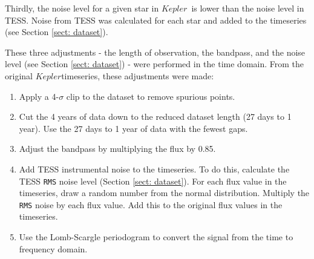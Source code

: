 \documentclass[a4paper,fleqn,usenatbib,useAMS]{mnras}
\newcommand{\kep}{\ensuremath{Kepler}\:}
\begin{document}

Thirdly, the noise level for a given star in \kep \ is lower than the noise level in TESS. %
Noise from TESS was calculated for each star and added to the timeseries (see Section \ref{sect: dataset}).

These three adjustments - the length of observation, the bandpass, and the noise level (see Section \ref{sect: dataset}) - were performed in the time domain. From the original \kep timeseries, these adjustments were made:
\begin{enumerate}
\item Apply a 4-$\sigma$ clip to the dataset to remove spurious points.
\item Cut the 4 years of data down to the reduced dataset length (27 days to 1 year). Use the 27 days to 1 year of data with the fewest gaps.%
\item Adjust the bandpass by multiplying the flux by 0.85.
\item Add TESS instrumental noise to the timeseries. To do this, calculate the TESS \texttt{RMS} noise level (Section \ref{sect: dataset}). For each flux value in the timeseries, draw a random number from the normal distribution. Multiply the \texttt{RMS} noise by each flux value. Add this to the original flux values in the timeseries.
\item Use the Lomb-Scargle periodogram to convert the signal from the time to frequency domain.
\end{enumerate}
\end{document}
